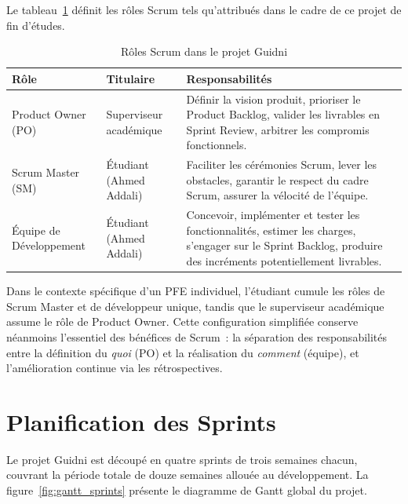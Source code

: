 Le tableau~\ref{tab:scrum_roles} définit les rôles Scrum tels qu'attribués dans le cadre de ce 
projet de fin d'études.

\begin{table}[H]
    \centering
    \caption{Rôles Scrum dans le projet Guidni}
    \label{tab:scrum_roles}
    \small
    \begin{tabular}{p{3cm} p{4cm} p{6cm}}
        \toprule
        \textbf{Rôle} & \textbf{Titulaire} & \textbf{Responsabilités} \\
        \midrule
        Product Owner (PO) & Superviseur académique & Définir la vision produit, prioriser le 
        Product Backlog, valider les livrables en Sprint Review, arbitrer les compromis 
        fonctionnels. \\
        \midrule
        Scrum Master (SM) & Étudiant (Ahmed Addali) & Faciliter les cérémonies Scrum, lever les 
        obstacles, garantir le respect du cadre Scrum, assurer la vélocité de l'équipe. \\
        \midrule
        Équipe de Développement & Étudiant (Ahmed Addali) & Concevoir, implémenter et tester les 
        fonctionnalités, estimer les charges, s'engager sur le Sprint Backlog, produire des 
        incréments potentiellement livrables. \\
        \bottomrule
    \end{tabular}
\end{table}

Dans le contexte spécifique d'un PFE individuel, l'étudiant cumule les rôles de Scrum Master et 
de développeur unique, tandis que le superviseur académique assume le rôle de Product Owner. Cette 
configuration simplifiée conserve néanmoins l'essentiel des bénéfices de Scrum~: la séparation 
des responsabilités entre la définition du \textit{quoi} (PO) et la réalisation du \textit{comment} 
(équipe), et l'amélioration continue via les rétrospectives.

\section{Planification des Sprints}

Le projet Guidni est découpé en quatre sprints de trois semaines chacun, couvrant la période 
totale de douze semaines allouée au développement. La figure~\ref{fig:gantt_sprints} présente 
le diagramme de Gantt global du projet.

